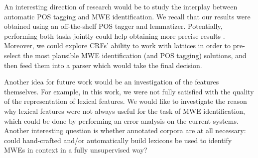 \documentclass[output=paper,
modfonts
]{langscibook}
\begin{document}
An interesting direction of research  would be to study the interplay between automatic POS tagging and MWE identification. We recall that our results were obtained using an off-the-shelf POS tagger and lemmatizer. Potentially, performing both tasks jointly could help obtaining more precise results \citep{constant-sigogne:2011:MWE}. Moreover, we could explore CRFs' ability to work with lattices in order to pre-select the most plausible MWE identification (and POS tagging) solutions, and then feed them into a parser which would take the final decision.

Another idea for future work would be an investigation of the features themselves. For example, in this work, we were not fully satisfied with the quality of the representation of lexical features. We would like to investigate the reason why lexical features were not always useful for the task of MWE identification, which could be done by performing an error analysis on the current systems. Another interesting question is whether annotated corpora are at all necessary: could hand-crafted and/or automatically build lexicons be used to identify MWEs in context in a fully unsupervised way?%






\end{document}
